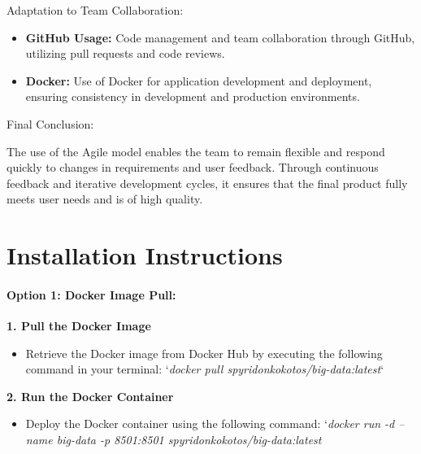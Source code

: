 \documentclass[unnumsec,webpdf,contemporary,large]{oup-authoring-template}%
\theoremstyle{thmstyleone}%
\theoremstyle{thmstyletwo}%
\theoremstyle{thmstylethree}%
\begin{document}
Adaptation to Team Collaboration:

\begin{itemize}
    \item \textbf{GitHub Usage:} Code management and team collaboration through GitHub, utilizing pull requests and code reviews.
   \item \textbf{Docker:} Use of Docker for application development and deployment, ensuring consistency in development and production environments.
\end{itemize}

Final Conclusion:
\vspace{0.2cm}

The use of the Agile model enables the team to remain flexible and respond quickly to changes in requirements and user feedback. Through continuous feedback and iterative development cycles, it ensures that the final product fully meets user needs and is of high quality.

\section{Installation Instructions}
\vspace{0.2cm}

\paragraph{\textbf{Option 1}: Docker Image Pull:}
\vspace{0.2cm}

\textbf{1. Pull the Docker Image}
\vspace{0.2cm}

\begin{itemize}
    \item Retrieve the Docker image from Docker Hub by executing the following command in your terminal: `\textit{docker pull spyridonkokotos/big-data:latest}`
\end{itemize}
\vspace{0.2cm}

\textbf{2. Run the Docker Container}
\vspace{0.2cm}

\begin{itemize}
    \item Deploy the Docker container using the following command: `\textit{docker run -d --name big-data -p 8501:8501 spyridonkokotos/big-data:latest}
\end{itemize}
\vspace{0.2cm}
\end{document}

